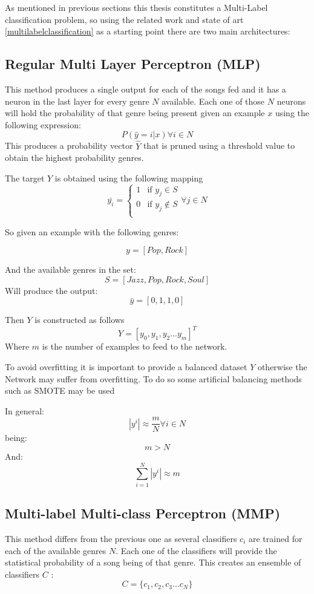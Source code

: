 As mentioned in previous sections this thesis constitutes a Multi-Label classification problem,
so using the related work and state of art \ref{multilabelclassification} as a starting point there are two main architectures:

\subsection{Regular Multi Layer Perceptron (MLP)}
\label{approach MLP}

This method produces a single output for each of the songs fed and it has a neuron in the last layer for every genre $N$ available. Each one of those \(N\) neurons will hold the probability of that genre being present given an example \(x\) using the following expression:
$$ P(\hat{y} = i | x) \forall i \in N$$
This produces a probability vector $\hat{Y}$ that is pruned using a threshold value to obtain the highest probability genres.

The target $Y$ is obtained using the following mapping
$$
\bar{y_i} =
\begin{cases} 
    1 & \text{if } y_j \in S\\
    0 & \text{if } y_j \notin S\\
\end{cases}
\forall j \in N
$$

So given an example with the following genres:

$$ y  = [ Pop, Rock ]$$

And the available genres in the set:
$$ S  = [Jazz, Pop, Rock, Soul]$$
Will produce the output:
$$ \bar{y}  = [0, 1, 1, 0]$$

Then $Y$  is constructed as follows
$$ Y = [y_0, y_1, y_2 ... y_m]^T$$
Where $m$ is the number of examples to feed to the network.

To avoid overfitting it is important to provide a balanced dataset $Y$ otherwise the Network may suffer from overfitting.
To do so some artificial balancing methods such as SMOTE\cite{Chawla2002} \cite{Blagus2013} may be used

In general:
$$ |y^i| \approx \frac{m}{N}   \forall i \in N $$
being:
$$ m > N $$
And:
$$ \sum_{i=1}^{N} |y^i| \approx m $$

\subsection{Multi-label Multi-class Perceptron (MMP)}
\label{approach MMP}

This method differs from the previous one as several classifiers $c_i$ are trained for each of the available genres $N$. 
Each one of the classifiers will provide the statistical probability of a song being of that genre.
This creates an ensemble of classifiers $C$ :
$$ C = \{c_1, c_2, c_3 ... c_N\} $$ 

